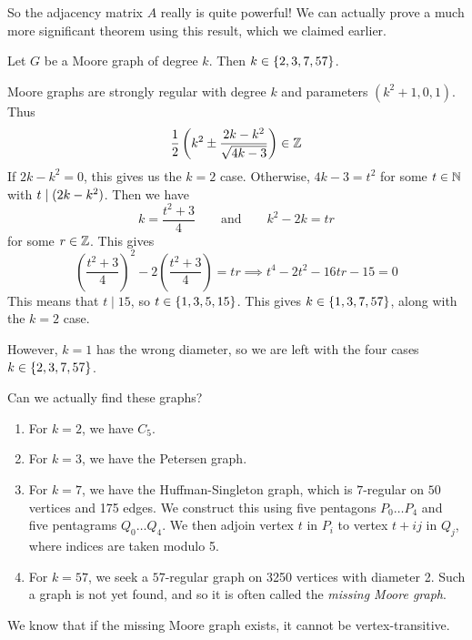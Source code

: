 \documentclass{article}
\begin{document}
So the adjacency matrix $A$ really is quite powerful! We can actually prove a much more significant theorem using this result, which we claimed earlier.

\begin{theorem}
    Let $G$ be a Moore graph of degree $k$. Then $k \in \left\lbrace 2, 3, 7, 57 \right\rbrace$.
\end{theorem}

\begin{prf}
    Moore graphs are strongly regular with degree $k$ and parameters $(k^2 + 1, 0, 1)$. Thus
\[
\frac{1}{2} \left( k^2 \pm \frac{2k-k^2}{\sqrt{4k-3}} \right) \in \mathbb{Z}
\]
	If $2k - k^2 = 0$, this gives us the $k=2$ case. Otherwise, $4k-3 = t^2$ for some $t \in \mathbb{N}$ with $t \mid (2k-k^2)$. Then we have
	\[
	k = \frac{t^2 + 3}{4} \qquad \text{and} \qquad k^2 - 2k = tr
	\]
	for some $r \in \mathbb{Z}$. This gives
	\[
	\left( \frac{t^2+3}{4} \right)^2 - 2 \left( \frac{t^2+3}{4} \right) = tr \implies t^4 - 2t^2 - 16tr - 15 = 0
	\]
	This means that $t \mid 15$, so $t \in \left\lbrace 1, 3, 5, 15 \right\rbrace$. This gives $k \in \left\lbrace 1, 3, 7, 57 \right\rbrace$, along with the $k=2$ case.
	
	However, $k=1$ has the wrong diameter, so we are left with the four cases $k \in \left\lbrace 2, 3, 7, 57 \right\rbrace$.
\end{prf}

\begin{remark}
    Can we actually find these graphs?
	\begin{enumerate}
	    \item For $k=2$, we have $C_5$.
	    \item For $k=3$, we have the Petersen graph.
	    \item For $k=7$, we have the Huffman-Singleton graph, which is $7$-regular on $50$ vertices and 175 edges. We construct this using five pentagons $P_0 \dots P_4$ and five pentagrams $Q_0 \dots Q_4$. We then adjoin vertex $t$ in $P_i$ to vertex $t + ij$ in $Q_j$, where indices are taken modulo 5.
	    \item For $k=57$, we seek a $57$-regular graph on 3250 vertices with diameter 2. Such a graph is not yet found, and so it is often called the \textit{missing Moore graph}.
	\end{enumerate}
\end{remark}

\begin{note}
	We know that if the missing Moore graph exists, it cannot be vertex-transitive.
\end{note}
\end{document}
